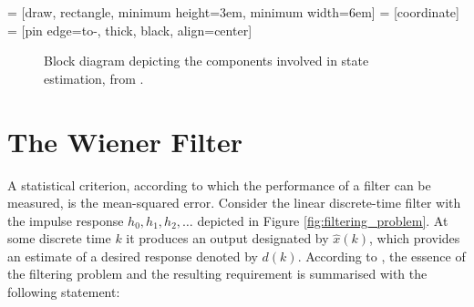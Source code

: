  = [draw, rectangle, minimum height=3em, minimum width=6em]
 = [coordinate]
 = [pin edge={to-, thick, black}, align=center]

\begin{figure}
\centering
{}
\caption{Block diagram depicting the components involved in state estimation, from \cite{haykin2002adaptive}.} \label{fig:state_estimation}
\end{figure}

\section{The Wiener Filter}

A statistical criterion, according to which the performance of a filter can be measured, is the mean-squared error. Consider the linear discrete-time filter with the impulse response $h_0, h_1, h_2, \dots$ depicted in Figure \ref{fig:filtering_problem}. At some discrete time $k$ it produces an output designated by $\hat{x}(k)$, which provides an estimate of a desired response denoted by $d(k)$. According to \citeauthor{haykin2002adaptive} \cite{haykin2002adaptive}, the essence of the filtering problem and the resulting requirement is summarised with the following statement:

